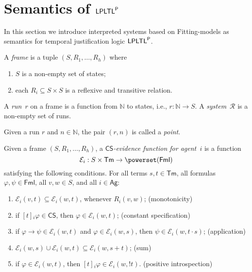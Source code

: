 \documentclass[envcountsect,envcountsame,oribibl,orivec]{llncs}
\newcommand{\Formulae}{\textsf{Fml}}
\newcommand{\limplies}{\rightarrow}
\newcommand{\LPLTLp}{\textsf{LPLTL}^{\sf P}}
\newcommand{\Terms}{\textsf{Tm}}
\newcommand{\Ag}{\textsf{Ag}}
\newcommand{\jbox}[1]{\left[#1\right]\!}
\newcommand{\tapp}{\cdot}
\newcommand{\tinspect}{!}
\newcommand{\CS}{\textsf{CS}}
\newcommand{\numberofagents}{h}
\newcommand{\agent}{i}
\newcommand{\runs}{\mathcal{R}}
\newcommand{\evidence}{\mathcal{E}}
\newcommand{\N}{\mathbb{N}}
\renewcommand{\phi}{\varphi}
\begin{document}
\section{Semantics of $\LPLTLp$}
\label{sec:Semantics}

In this section we introduce interpreted systems based on  Fitting-models as semantics for temporal justification logic $\LPLTLp$.

\begin{definition}\label{def:frame-run-system}
	A \emph{frame} is a tuple $(S, R_1,\ldots,R_\numberofagents)$ where
	\begin{enumerate}
		\item $S$ is a non-empty set of states;
		\item each $R_i \subseteq S \times S$ is a reflexive and transitive relation. 
	\end{enumerate}
	A \emph{run}~$r$ on a frame is a function from $\N$ to states, i.e., $r: \N \to S$. A \emph{system}~$\runs$ is a non-empty set of runs. 
	
	Given a run $r$ and $n \in \N$, the pair $(r,n)$ is called a \emph{point}.
\end{definition}

\begin{definition}\label{def:evidence function for LPLTL}
	Given a frame $(S, R_1,\ldots,R_\numberofagents)$,
	a \emph{$\CS$-evidence function for agent~$\agent$} is a function 
	\[
	\evidence_i: S \times \Terms \to \powerset(\Formulae)
	\]
	satisfying the following conditions.
	For all terms $s,t \in \Terms$, all formulas $\phi,\psi \in \Formulae$, all $v,w \in S$, and all $i \in \Ag$:
	\begin{enumerate}
		\item 
		$\evidence_\agent(v,t) \subseteq \evidence_\agent(w, t)$, whenever $R_i(v,w)$; \hfill (monotonicity)
		\item 
		if $\jbox{t}_\agent \phi \in \CS$, then $\phi \in \evidence_\agent(w,t)$; \hfill (constant specification)

		\item 
		if $\phi \limplies \psi \in \evidence_\agent(w,t)$ and $\phi \in \evidence_\agent(w,s)$, then $\psi \in \evidence_\agent(w, t \tapp s)$; \hfill (application)
		
		\item 
		$\evidence_\agent(w,s) \cup \evidence_\agent(w,t) \subseteq \evidence_\agent(w,s + t)$; \hfill (sum)
		
		\item 
		if $\phi \in \evidence_\agent(w,t)$, then $\jbox{t}_\agent \phi \in \evidence_\agent(w,\tinspect t)$. \hfill (positive introspection)
	\end{enumerate}
\end{definition}
\end{document}
